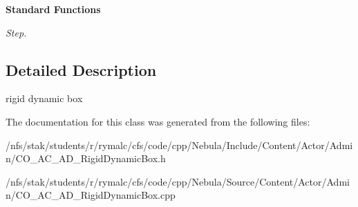 \begin{Indent}{\bf Standard Functions}
\begin{DoxyCompactItemize}
\begin{DoxyCompactList}\small\item\em Step. \item\end{DoxyCompactList}\end{DoxyCompactItemize}
\end{Indent}


\subsection{Detailed Description}
rigid dynamic box 

The documentation for this class was generated from the following files:\begin{DoxyCompactItemize}
\item 
/nfs/stak/students/r/rymalc/cfs/code/cpp/Nebula/Include/Content/Actor/Admin/CO\_\-AC\_\-AD\_\-RigidDynamicBox.h\item 
/nfs/stak/students/r/rymalc/cfs/code/cpp/Nebula/Source/Content/Actor/Admin/CO\_\-AC\_\-AD\_\-RigidDynamicBox.cpp\end{DoxyCompactItemize}
